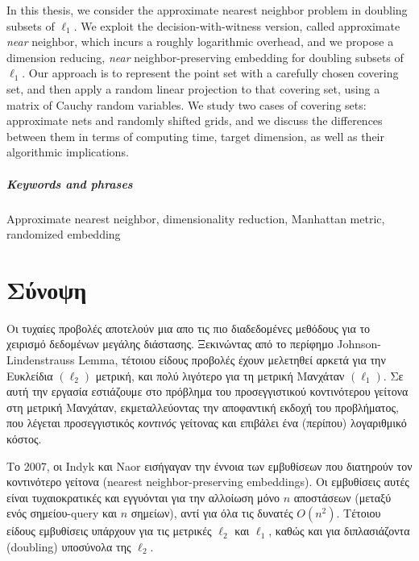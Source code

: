 \documentclass[10pt,a4paper,twoside]{book}
\theoremstyle{definition}
\theoremstyle{remark}
\begin{document}
In this thesis, we consider the approximate nearest neighbor problem in doubling subsets of $\ell_1$. We exploit the decision-with-witness version, called approximate \textit{near} neighbor, which incurs a roughly logarithmic overhead, and we propose a dimension reducing, \textit{near} neighbor-preserving embedding for doubling subsets of $\ell_1$. Our approach is to represent the point set with a carefully chosen covering set, and then apply a random linear projection to that covering set, using a matrix of Cauchy random variables. We study two cases of covering sets: approximate nets and randomly shifted grids, and we discuss the differences between them in terms of computing time, target dimension, as well as their algorithmic implications.

\vfill
\paragraph{Keywords and phrases} Approximate nearest neighbor, dimensionality reduction, Manhattan metric, randomized embedding

\clearpage

\thispagestyle{empty}
\null 
\clearpage

\thispagestyle{empty}
\chapter*{Σύνοψη}
Οι τυχαίες προβολές αποτελούν μια απο τις πιο διαδεδομένες μεθόδους για το χειρισμό δεδομένων μεγάλης διάστασης. Ξεκινώντας από το περίφημο Johnson-Lindenstrauss Lemma, τέτοιου είδους προβολές έχουν μελετηθεί αρκετά για την Ευκλείδια $(\ell_2)$ μετρική, και πολύ λιγότερο για τη μετρική Μανχάταν $(\ell_1)$. Σε αυτή την εργασία εστιάζουμε στο πρόβλημα του προσεγγιστικού κοντινότερου γείτονα στη μετρική Μανχάταν, εκμεταλλεύοντας την αποφαντική εκδοχή του προβλήματος, που λέγεται προσεγγιστικός \textit{κοντινός} γείτονας και επιβάλει ένα (περίπου) λογαριθμικό κόστος.

Το 2007, οι Indyk και Naor εισήγαγαν την έννοια των εμβυθίσεων που διατηρούν τον κοντινότερο γείτονα (nearest neighbor-preserving embeddings). Οι εμβυθίσεις αυτές είναι τυχαιοκρατικές και εγγυόνται για την αλλοίωση μόνο $n$ αποστάσεων (μεταξύ ενός σημείου-query και $n$ σημείων), αντί για όλα τις δυνατές $O(n^2)$. Τέτοιου είδους εμβυθίσεις υπάρχουν για τις μετρικές $\ell_2$ και $\ell_1$, καθώς και για διπλασιάζοντα (doubling) υποσύνολα της $\ell_2$.
\end{document}
